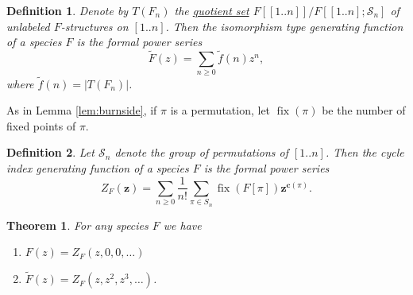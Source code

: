\documentclass[12pt]{article}
\theoremstyle{plain}
\newtheorem{thm}{Theorem}
\newtheorem{defin}{Definition}
\DeclareMathOperator{\fix}{fix}
\begin{document}
\begin{defin}
\label{defin:t}
Denote by \( T(F_n) \) the \hyperlink{quotient}{quotient set} \(F[[1..n]]/ F[[1..n]; \mathcal{S}_n] \) of unlabeled \(F\)-structures on \( [1..n] \).
Then the \emph{isomorphism type generating function} of a species \(F\) is the formal power series
\[ \tilde{F}(z) = \sum_{n \geq 0} \tilde{f}(n) z^n, \]
where \(\tilde{f}(n) = |T(F_n)| \).
\end{defin}

As in Lemma \ref{lem:burnside}, if \( \pi \) is a permutation, let \(\fix(\pi)\) be the number of fixed points of \( \pi \).

\begin{defin}
Let \( \mathcal{S}_n \) denote the group of permutations of \( [1..n] \).
Then the \emph{cycle index generating function} of a species \( F \) is the formal power series
\[ Z_F(\boldsymbol{z}) = \sum_{n \geq 0}\frac{1}{n!}  \sum_{\pi \in S_n} \fix(F[\pi]) \boldsymbol{z}^{\boldsymbol{c}(\pi)} . \]
\end{defin}

\begin{thm}
For any species \( F \) we have
\begin{enumerate}
 \item \(F(z) = Z_F(z,0,0,\dots) \)
 \item \( \tilde{F}(z) = Z_F(z, z^2, z^3, \dots ) \).
\end{enumerate}
\end{thm}
\end{document}
